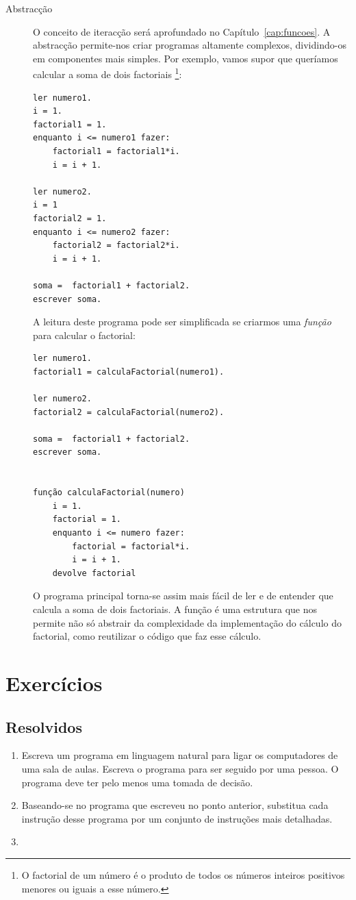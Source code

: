 \begin{description}
\item[Abstracção] O conceito de iteracção será aprofundado no Capítulo~\ref{cap:funcoes}. A abstracção permite-nos criar programas altamente complexos, dividindo-os em componentes mais simples. Por exemplo, vamos supor que queríamos calcular a soma de dois factoriais%
\footnote{O factorial de um número é o produto de todos os números inteiros positivos menores ou iguais a esse número.}:
\begin{lstlisting} 
ler numero1.
i = 1.
factorial1 = 1.
enquanto i <= numero1 fazer:
	factorial1 = factorial1*i.
	i = i + 1.

ler numero2.
i = 1
factorial2 = 1.
enquanto i <= numero2 fazer:
	factorial2 = factorial2*i.
	i = i + 1.

soma =  factorial1 + factorial2.
escrever soma.
\end{lstlisting}
A leitura deste programa pode ser simplificada se criarmos uma \emph{função} para calcular o factorial:
\begin{lstlisting} 
ler numero1.
factorial1 = calculaFactorial(numero1).

ler numero2.
factorial2 = calculaFactorial(numero2).

soma =  factorial1 + factorial2.
escrever soma.


função calculaFactorial(numero) 
	i = 1.
	factorial = 1.
	enquanto i <= numero fazer:
		factorial = factorial*i.
		i = i + 1.
	devolve factorial

\end{lstlisting}
O programa principal torna-se assim mais fácil de ler e de entender que calcula a soma de dois factoriais. A função é uma estrutura que nos permite não só abstrair da complexidade da implementação do cálculo do factorial, como reutilizar o código que faz esse cálculo.
\end{description}



\section{Exercícios}

\subsection{Resolvidos}

\begin{enumerate}
	\item \label{exe:1_1} Escreva um programa em linguagem natural para ligar os computadores de uma sala de aulas. Escreva o programa para ser seguido por uma pessoa. O programa deve ter pelo menos uma tomada de decisão.
	
	\item \label{exe:1_2} Baseando-se no programa que escreveu no ponto anterior, substitua cada instrução desse programa por um conjunto de instruções mais detalhadas.
	
	\item \label{exe:1_3} 
\end{enumerate}

